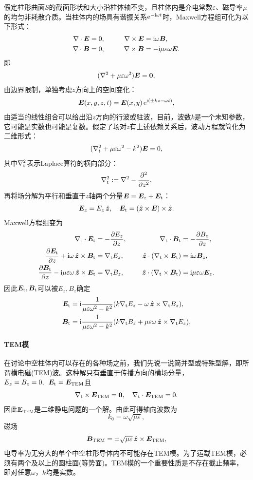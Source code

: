 假定柱形曲面$S$的截面形状和大小沿柱体轴不变，且柱体内是介电常数$\varepsilon$、磁导率$\mu$的均匀非耗散介质。当柱体内的场具有谐振关系$\e{-\i\omega t}$时，Maxwell方程组可化为以下形式：
\begin{alignat*}{2}
    \div\bm E&=0,&\qquad\curl\bm E&=\i\omega\bm B,\\
    \div\bm B&=0,&\curl\bm B&=-\i\mu\varepsilon\omega\bm E.
\end{alignat*}
即
\[
    (\lapla+\mu\varepsilon\omega^2)\bm E=\bm 0,
\]
由边界限制，单独考虑$z$方向上的空间变化：
\[
    \bm E(x,y,z,t)=\bm E(x,y)\e{\i(\pm kz-\omega t)},
\]
由适当的线性组合可以给出沿$z$方向的行波或驻波，目前，波数$k$是一个未知参数，它可能是实数也可能是复数。假定了场对$z$有上述依赖关系后，波动方程就简化为二维形式：
\[
    (\lapla_\t+\mu\varepsilon\omega^2-k^2)\bm E=0,
\]
其中$\lapla_\t$表示Laplace算符的横向部分：
\[
    \lapla_\t:=\lapla-\pp[2]z,
\]
再将场分解为平行和垂直于$z$轴两个分量$\bm E=\bm E_z+\bm E_\t$：
\[
    \bm E_z=E_z\uvec z,\quad\bm E_\t=(\uvec z\times\bm E)\times\uvec z.
\]
Maxwell方程组变为
\begin{alignat*}{2}
    \nabla_\t\cdot\bm E_\t&=-\pv{E_z}z,&\qquad\qquad\nabla_\t\cdot\bm B_\t&=-\pv{B_z}z,\\
    \pv{\bm E_\t}z+\i\omega\uvec z\times\bm B_\t&=\nabla_\t E_z,&\uvec z\cdot(\nabla_\t\times\bm E_\t)&=\i\omega\bm B_z,\\
    \pv{\bm B_\t}z-\i\mu\varepsilon\omega\uvec z\times\bm E_\t&=\nabla_\t B_z,&\uvec z\cdot(\nabla_\t\times\bm B_\t)&=\i\mu\varepsilon\omega\bm E_z.
\end{alignat*}
因此$\bm E_\t,\bm B_\t$可以被$E_z,B_z$确定
\begin{align}
    \bm E_\t&=\i\frac1{\mu\varepsilon\omega^2-k^2}(k\nabla_\t E_z-\omega\uvec z\times\nabla_\t B_z),\\
    \bm B_\t&=\i\frac1{\mu\varepsilon\omega^2-k^2}(k\nabla_\t B_z+\mu\varepsilon\omega\uvec z\times\nabla_\t E_z),
\end{align}
\paragraph{TEM模}
在讨论中空柱体内可以存在的各种场之前，我们先说一说简并型或特殊型解，即所谓横电磁(TEM)波。这种解只有垂直于传播方向的横场分量，$E_z=B_z=0,\enspace\bm E_\t=\bm E_\text{TEM}$且
\begin{equation}
    \nabla_\t\times\bm E_\text{TEM}=\bm 0,\quad\nabla_\t\cdot\bm E_\text{TEM}=0.
\end{equation}
因此$\bm E_\text{TEM}$是二维静电问题的一个解。由此可得轴向波数为
\begin{equation}
    \label{eqn:TEM k0}
    k_0=\omega\sqrt{\mu\varepsilon},
\end{equation}
磁场 
\[
    \bm B_\text{TEM}=\pm\sqrt{\mu\varepsilon}\uvec z\times\bm E_\text{TEM},
\]
电导率为无穷大的单个中空柱形导体内不可能存在TEM模。为了运载TEM模，必须有两个及以上的圆柱面(等势面)。TEM模的一个重要性质是不存在截止频率，即对任意$\omega$，$k$均是实数。
